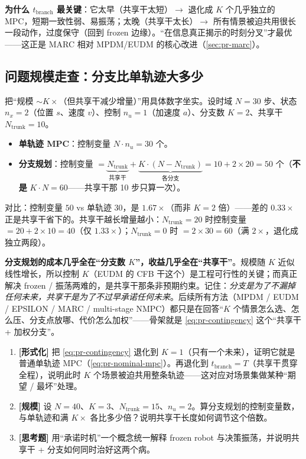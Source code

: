 \textbf{为什么 $t_{\mathrm{branch}}$ 最关键}：它太早（共享干太短）$\to$ 退化成 $K$ 个几乎独立的 MPC，短期一致性弱、易振荡；太晚（共享干太长）$\to$ 所有情景被迫共用很长一段动作，过度保守（回到 frozen 边缘）。“在信息真正揭示的时刻分叉”才最优——这正是 MARC 相对 MPDM/EUDM 的核心改进（\cref{sec:pr-marc}）。

\subsection{问题规模走查：分支比单轨迹大多少}
\label{sec:pr-branch-size}

把“规模 $\sim K\times$（但共享干减少增量）”用具体数字坐实。设时域 $N=30$ 步、状态 $n_x=2$（位置 $s$、速度 $v$）、控制 $n_u=1$（加速度 $a$）、分支数 $K=2$、共享干 $N_{\mathrm{trunk}}=10$。
\begin{itemize}
  \item \textbf{单轨迹 MPC}：控制变量 $N\cdot n_u=30$ 个。
  \item \textbf{分支规划}：控制变量 $=\underbrace{N_{\mathrm{trunk}}}_{\text{共享干}}+\underbrace{K\cdot(N-N_{\mathrm{trunk}})}_{\text{各分支}}=10+2\times20=50$ 个（\textbf{不是} $K\cdot N=60$——共享干那 10 步只算一次）。
\end{itemize}
对比：控制变量 $50$ vs 单轨迹 $30$，是 $1.67\times$（而非 $K=2$ 倍）——差的 $0.33\times$ 正是共享干省下的。共享干越长增量越小：$N_{\mathrm{trunk}}=20$ 时控制变量 $=20+2\times10=40$（仅 $1.33\times$）；$N_{\mathrm{trunk}}=0$ 时 $=2\times30=60$（满 $2\times$，退化成独立两段）。

\begin{insight}
\textbf{分支规划的成本几乎全在“分支数 $K$”，收益几乎全在“共享干”}。规模随 $K$ 近似线性增长，所以控制 $K$（EUDM 的 CFB 干这个）是工程可行性的关键；而真正解决 frozen / 振荡两难的，是共享干那条非预期约束。记住：\emph{分支是为了不漏掉任何未来，共享干是为了不过早承诺任何未来}。后续所有方法（MPDM / EUDM / EPSILON / MARC / multi-stage NMPC）都只是在回答“$K$ 个情景怎么选、怎么压、分支点放哪、代价怎么加权”——骨架就是 \cref{eq:pr-contingency} 这个“共享干 + 加权分支”。
\end{insight}

\begin{practice}
\begin{enumerate}
  \item \textbf{[形式化]} 把 \cref{eq:pr-contingency} 退化到 $K=1$（只有一个未来），证明它就是普通单轨迹 MPC（\cref{eq:pr-nominal-mpc}）。再退化到 $t_{\mathrm{branch}}=T$（共享干贯穿全程），说明此时 $K$ 个场景被迫共用整条轨迹——这对应对场景集做某种“期望 / 最坏”处理。
  \item \textbf{[规模]} 设 $N=40$、$K=3$、$N_{\mathrm{trunk}}=15$、$n_u=2$。算分支规划的控制变量数，与单轨迹和满 $K\times$ 各比多少倍？说明共享干长度如何调节这个倍数。
  \item \textbf{[思考题]} 用“承诺时机”一个概念统一解释 frozen robot 与决策振荡，并说明共享干 + 分支如何同时治好这两个病。
\end{enumerate}
\end{practice}

